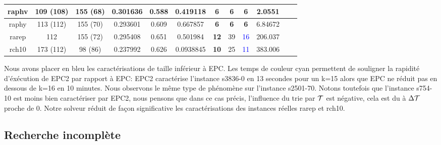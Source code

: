 \begin{center}
\begin{tabular}{|c|c|c|c|c|c|c|c|c|c|c|c|}
\hline 
raphv & 109 (108) & 155 (68) & 0.301636 & 0.588 & 0.419118 & \textbf{6} & \textbf{6} & \textbf{6} & 2.0551 \\ 
\hline 
raphy & 113 (112) & 155 (70) & 0.293601 & 0.609 & 0.667857 & \textbf{6} & \textbf{6} & \textbf{6} & 6.84672 \\ 
\hline 
rarep & 112 & 155 (72) & 0.295408 & 0.651 & 0.501984 & \textbf{12} & 39 & \textcolor{blue}{16} & 206.037 \\ 
\hline 
rch10 & 173 (112) & 98 (86) & 0.237992 & 0.626 & 0.0938845 & \textbf{10} & 25 & \textcolor{blue}{11} & 383.006\\ 
\hline 
\end{tabular} 
\end{center}

Nous avons placer en bleu les caractérisations de taille inférieur à EPC. Les temps de couleur cyan permettent de souligner la rapidité d'éxécution de EPC2 par rapport à EPC:  EPC2 caractérise l'instance s3836-0 en 13 secondes pour un k=15 alors que EPC ne réduit pas en dessous de k=16 en 10 minutes. Nous observons le même type de phénomène sur l'instance s2501-70. Notons toutefois que l'instance s754-10 est moins bien caractériser par EPC2, nous pensons que dans ce cas précis, l'influence du trie par $\cal{T}$ est négative, cela est du à $\Delta\cal{T}$ proche de 0. Notre solveur réduit de façon significative les caractérisations des instances réelles rarep et rch10. 


\subsection{Recherche incomplète}
